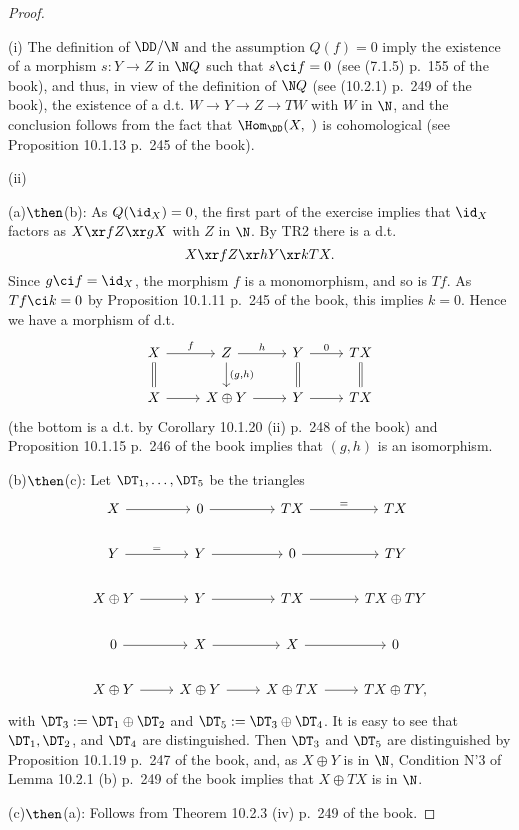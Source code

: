 \documentclass[12pt]{article}
\theoremstyle{remark}
\theoremstyle{definition}
\begin{document}
\begin{proof}\ 

\nn(i) The definition of $\DD/\N$ and the assumption $Q(f)=0$ imply the existence of a morphism $s:Y\to Z$ in $\N Q$ such that $s\ci f=0$ (see (7.1.5) p.~155 of the book), and thus, in view of the definition of $\N Q$ (see (10.2.1) p.~249 of the book), the existence of a d.t. $W\to Y\to Z\to TW$ with $W$ in $\N$, and the conclusion follows from the fact that $\Hom_\DD(X,\ )$ is cohomological (see Proposition 10.1.13 p.~245 of the book). 

\nn(ii)

\nn(a)$\then$(b): As $Q(\id_X)=0$, the first part of the exercise implies that $\id_X$ factors as $X\xr fZ\xr g X$ with $Z$ in $\N$. By TR2 there is a d.t. 
$$
X\xr fZ\xr hY\xr kTX.
$$ 
Since $g\ci f=\id_X$, the morphism $f$ is a monomorphism, and so is $Tf$. As $Tf\ci k=0$ by Proposition 10.1.11 p.~245 of the book, this implies $k=0$. Hence we have a morphism of d.t. 
$$
\begin{tikzcd}
X\ar[equal]{d}\ar{r}{f}&Z\ar{d}{(g,h)}\ar{r}{h}&Y\ar[equal]{d}\ar{r}{0}&TX\ar[equal]{d}\\ 
X\ar{r}&X\oplus Y\ar{r}&Y\ar{r}&TX
\end{tikzcd}
$$
(the bottom is a d.t. by Corollary 10.1.20 (ii) p.~248 of the book) and Proposition 10.1.15 p.~246 of the book implies that $(g,h)$ is an isomorphism.\bigskip 

\nn(b)$\then$(c): Let $\DT_1,\dots,\DT_5$ be the triangles
$$
\begin{tikzcd}
X\ar{r}&0\ar{r}&TX\ar{r}{=}&TX\\ 
Y\ar{r}{=}&Y\ar{r}&0\ar{r}&TY\\ 
X\oplus Y\ar{r}&Y\ar{r}&TX\ar{r}&TX\oplus TY\\ 
0\ar{r}&X\ar{r}&X\ar{r}&0\\ 
X\oplus Y\ar{r}&X\oplus Y\ar{r}&X\oplus TX\ar{r}&TX\oplus TY,
\end{tikzcd}
$$ 
with $\DT_3:=\DT_1\oplus\DT_2$ and $\DT_5:=\DT_3\oplus\DT_4$. It is easy to see that $\DT_1,\DT_2$, and $\DT_4$ are distinguished. Then $\DT_3$ and $\DT_5$ are distinguished by Proposition 10.1.19 p.~247 of the book, and, as $X\oplus Y$ is in $\N$, Condition N'3 of Lemma 10.2.1 (b) p.~249 of the book implies that $X\oplus TX$ is in $\N$.

\nn(c)$\then$(a): Follows from Theorem 10.2.3 (iv) p.~249 of the book.
\end{proof} 

\end{document}

